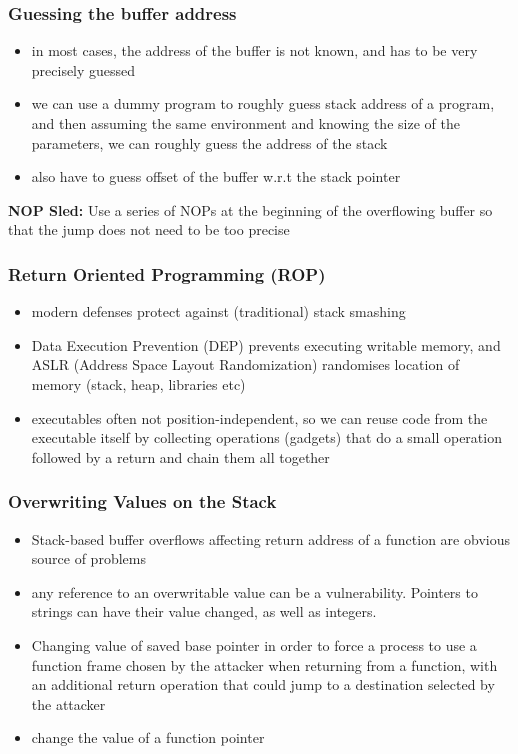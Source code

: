 \documentclass{article}
\begin{document}
\subsubsection{Guessing the buffer address}
\begin{itemize}
    \item in most cases, the address of the buffer is not known, and has to be very precisely guessed
    \item we can use a dummy program to roughly guess stack address of a program, and then assuming the same environment and knowing the size of the parameters, we can roughly guess the address of the stack
    \item also have to guess offset of the buffer w.r.t the stack pointer
\end{itemize}
\textbf{NOP Sled:} Use a series of NOPs at the beginning of the overflowing buffer so that the jump does not need to be too precise
\subsubsection{Return Oriented Programming (ROP)}
\begin{itemize}
    \item modern defenses protect against (traditional) stack smashing
    \item Data Execution Prevention (DEP) prevents executing writable memory, and ASLR (Address Space Layout Randomization) randomises location of memory (stack, heap, libraries etc)
    \item executables often not position-independent, so we can reuse code from the executable itself by collecting operations (gadgets) that do a small operation followed by a return and chain them all together
\end{itemize}
\subsubsection{Overwriting Values on the Stack}
\begin{itemize}
    \item Stack-based buffer overflows affecting return address of a function are obvious source of problems
    \item any reference to an overwritable value can be a vulnerability. Pointers to strings can have their value changed, as well as integers.
    \item Changing value of saved base pointer in order to force a process to use a function frame chosen by the attacker when returning from a function, with an additional return operation that could jump to a destination selected by the attacker
    \item change the value of a function pointer
\end{itemize}
\end{document}
